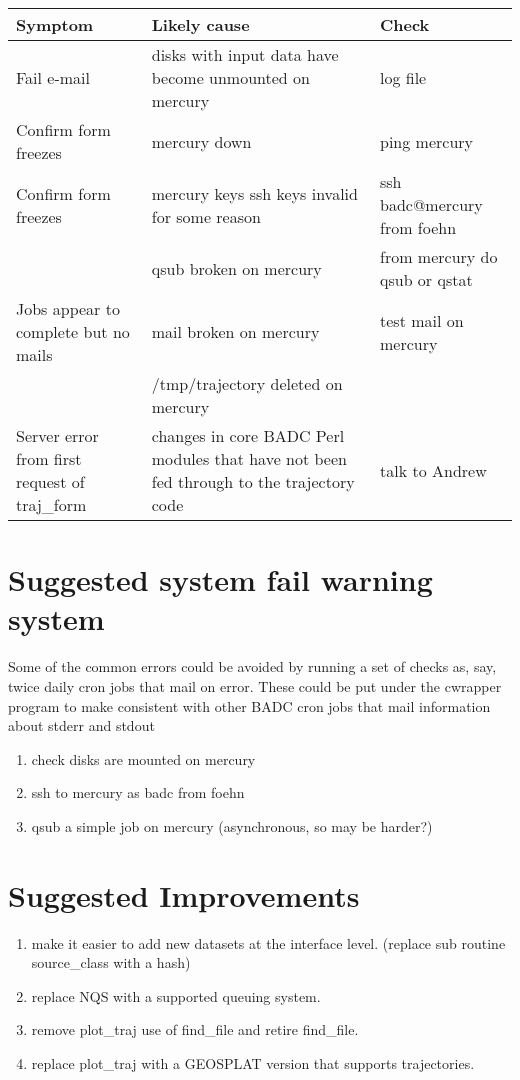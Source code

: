 \documentclass[a4paper]{article}
\begin{document}
\begin{tabular}{|p{100pt}|p{100pt}|p{100pt}|}
\hline
{\bf Symptom} & {\bf Likely cause} & {\bf Check} \\
\hline
Fail e-mail & disks with input data have become unmounted on mercury & log file \\
\hline
Confirm form freezes & mercury down & ping mercury \\
\hline
Confirm form freezes & mercury keys ssh keys invalid for some reason & ssh badc@mercury from foehn \\
\hline
 & qsub broken on mercury & from mercury do qsub or qstat \\
\hline
Jobs appear to complete  but no mails & mail broken on mercury & test mail on mercury \\
\hline
 & /tmp/trajectory deleted on mercury & \\
\hline
Server error from first request of traj\_form & changes in core BADC Perl modules that have not been fed through to the trajectory code & talk to Andrew \\
\hline
\end{tabular}

\section{Suggested system fail warning system}

Some of the common errors could be avoided by running a set of checks
as, say, twice daily cron jobs that mail on error.  These could be put
under the cwrapper program to make consistent with other BADC cron
jobs that mail information about stderr and stdout

\begin{enumerate}
\item check disks are mounted on mercury
\item ssh to mercury as badc from foehn
\item qsub a simple job on mercury (asynchronous, so may be harder?)
\end{enumerate}

\section{Suggested Improvements}

\begin{enumerate}
\item make it easier to add new datasets at the interface level. (replace sub routine source\_class with a hash)
\item replace NQS with a supported queuing system.
\item remove plot\_traj use of find\_file and retire find\_file.
\item replace plot\_traj with a GEOSPLAT version that supports
trajectories.
\end{enumerate}
\end{document}
